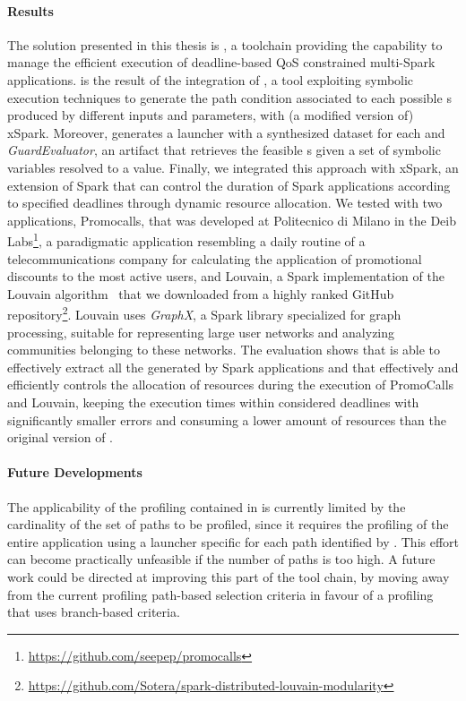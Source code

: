 \paragraph{Results}
The solution presented in this thesis is \tool, a toolchain providing the capability to manage the efficient execution of deadline-based QoS constrained multi-\plan Spark applications. 
\tool is the result of the integration of \dSymb, a tool exploiting symbolic execution techniques to generate the path condition associated to each possible {\plan}s produced by different inputs and parameters, with (a modified version of) xSpark.
Moreover, \tool generates a launcher with a synthesized dataset for each \plan and \textit{GuardEvaluator}, an artifact that retrieves the feasible {\plan}s given a set of symbolic variables resolved to a value. Finally, we integrated this approach with xSpark, an extension of Spark that can control the duration of Spark applications according to specified deadlines through dynamic resource allocation. 
We tested \tool with two applications, Promocalls, that was developed at Politecnico di Milano in the Deib Labs\footnote{\url{https://github.com/seepep/promocalls}}, a paradigmatic application resembling a daily routine of a telecommunications company for calculating the application of promotional discounts to the most active users, and Louvain, a Spark implementation of the Louvain algorithm~\cite{Louvain} that we downloaded from a highly ranked GitHub repository\footnote{\url{https://github.com/Sotera/spark-distributed-louvain-modularity}}. Louvain uses \textit{GraphX}, a Spark library specialized for graph processing, suitable for representing large user networks and analyzing communities belonging to these networks.
The evaluation shows that \approach is able to effectively extract all the \plans generated by Spark applications and that \tool effectively and efficiently controls the allocation of resources during the execution of PromoCalls and Louvain, keeping the execution times within considered deadlines with significantly smaller errors and consuming a lower amount of resources than the original version of \cSpark.
\paragraph{Future Developments}
The applicability of the profiling contained in \tool is currently limited by the  cardinality of the set of paths to be profiled, since it requires the profiling of the entire application using a launcher specific for each path identified by \dSymb. This effort can  become practically unfeasible if the number of paths is too high. A future work could be directed at improving this part of the tool chain, by moving away from the current profiling path-based selection criteria in favour of a profiling  that uses branch-based criteria.

